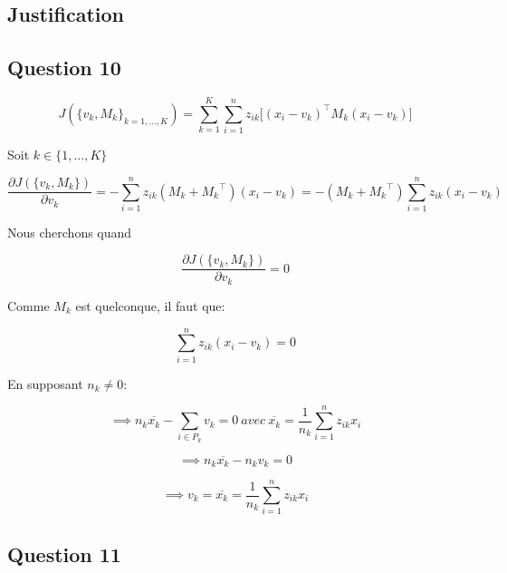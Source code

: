 \documentclass[a4paper,11pt,oneside,roman]{article}
\begin{document}
    \subsection{Justification}
    \subsection*{Question 10}
    \begin{equation}
        J(\{v_k, M_k\}_{k=1,...,K}) = \sum^{K}_{k=1}\sum^{n}_{i=1} z_{ik} \big[ (x_i-v_k)^\top M_k (x_i-v_k)\big]
    \end{equation}

    Soit $k\in \{1,...,K\}$

    \begin{equation}
        \frac{\partial J(\{v_k, M_k\})}{\partial v_k} = -\sum^{n}_{i=1} z_{ik} (M_k + {M_k}^\top) (x_i-v_k) = -(M_k + {M_k}^\top) \sum^{n}_{i=1} z_{ik} (x_i-v_k)
    \end{equation}

    Nous cherchons quand 

    \begin{equation}
        \frac{\partial J(\{v_k, M_k\})}{\partial v_k} = 0
    \end{equation}

    Comme $M_k$ est quelconque, il faut que:

    \begin{equation}
        \sum^{n}_{i=1} z_{ik} (x_i-v_k) = 0
    \end{equation}
    
    En supposant $n_k \neq 0$:

    \begin{equation}
        \implies n_k \overline{x_k} - \sum_{i\in P_k} v_k = 0 \ avec \ \overline{x_k} = \frac{1}{n_k}\sum_{i=1}^{n}z_{ik}x_i
    \end{equation}

    \begin{equation}
        \implies n_k \overline{x_k} - n_k v_k = 0
    \end{equation}
    
    \begin{equation}
        \implies v_k = \overline{x_k} = \frac{1}{n_k}\sum_{i=1}^{n}z_{ik}x_i
    \end{equation}

    \subsection*{Question 11}
\end{document}

